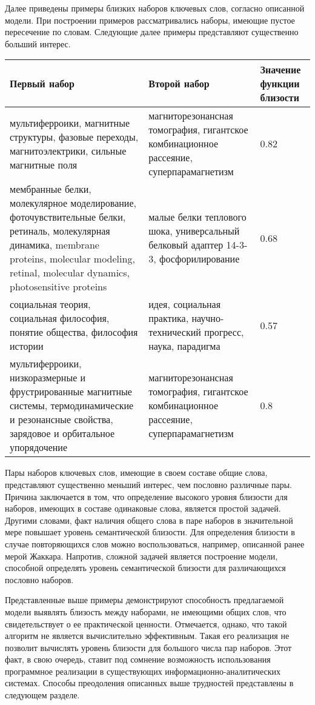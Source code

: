 Далее приведены примеры близких наборов ключевых слов, согласно описанной модели. При построении примеров рассматривались наборы, имеющие пустое пересечение по словам. Следующие далее примеры представляют существенно больший интерес.

\begin{tabularx}{16cm}{|X|X|X|}
        \hline
        Первый набор & Второй набор & Значение функции близости \\ \hline
        мультиферроики, магнитные структуры, фазовые переходы, магнитоэлектрики, сильные магнитные поля & магниторезонансная томография, гигантское комбинационное рассеяние, суперпарамагнетизм & 0.82 \\ \hline
        мембранные белки, молекулярное моделирование, фоточувствительные белки, ретиналь, молекулярная динамика, membrane proteins, molecular modeling, retinal, molecular dynamics, photosensitive proteins & малые белки теплового шока, универсальный белковый адаптер 14-3-3, фосфорилирование & 0.68 \\ \hline
        социальная теория, социальная философия, понятие общества, философия истории & идея, социальная практика, научно-технический прогресс, наука, парадигма & 0.57 \\ \hline
        мультиферроики, низкоразмерные и фрустрированные магнитные системы, термодинамические и резонансные свойства, зарядовое и орбитальное упорядочение & магниторезонансная томография, гигантское комбинационное рассеяние, суперпарамагнетизм & 0.8 \\ \hline

\end{tabularx}

Пары наборов ключевых слов, имеющие в своем составе общие слова, представляют существенно меньший интерес, чем пословно различные пары. Причина заключается в том, что определение высокого уровня близости для наборов, имеющих в составе одинаковые слова, является простой задачей. Другими словами, факт наличия общего слова в паре наборов в значительной мере повышает уровень семантической близости. Для определения близости в случае повторяющихся слов можно воспользоваться, например, описанной ранее мерой Жаккара. Напротив, сложной задачей является построение модели, способной определять уровень семантической близости для различающихся пословно наборов.

Представленные выше примеры демонстрируют способность предлагаемой модели выявлять близость между наборами, не имеющими общих слов, что свидетельствует о ее практической ценности. Отмечается, однако, что такой алгоритм не является вычислительно эффективным. Такая его реализация не позволит вычислять уровень близости для большого числа пар наборов. Этот факт, в свою очередь, ставит под сомнение возможность использования программное реализации в существующих информационно-аналитических системах. Способы преодоления описанных выше трудностей представлены в следующем разделе.

